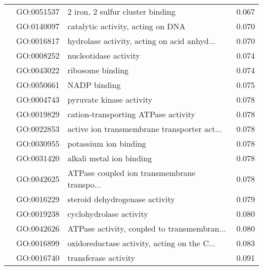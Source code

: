 \begin{longtable}{lllr}
   & GO:0051537 &             2 iron, 2 sulfur cluster binding &         0.067 \\
   & GO:0140097 &            catalytic activity, acting on DNA &         0.070 \\
   & GO:0016817 &  hydrolase activity, acting on acid anhyd... &         0.070 \\
   & GO:0008252 &                        nucleotidase activity &         0.074 \\
   & GO:0043022 &                             ribosome binding &         0.074 \\
   & GO:0050661 &                                 NADP binding &         0.075 \\
   & GO:0004743 &                     pyruvate kinase activity &         0.078 \\
   & GO:0019829 &          cation-transporting ATPase activity &         0.078 \\
   & GO:0022853 &  active ion transmembrane transporter act... &         0.078 \\
   & GO:0030955 &                        potassium ion binding &         0.078 \\
   & GO:0031420 &                     alkali metal ion binding &         0.078 \\
   & GO:0042625 &  ATPase coupled ion transmembrane transpo... &         0.078 \\
   & GO:0016229 &               steroid dehydrogenase activity &         0.079 \\
   & GO:0019238 &                      cyclohydrolase activity &         0.080 \\
   & GO:0042626 &  ATPase activity, coupled to transmembran... &         0.080 \\
   & GO:0016899 &  oxidoreductase activity, acting on the C... &         0.083 \\
   & GO:0016740 &                         transferase activity &         0.091 \\
\end{longtable}
